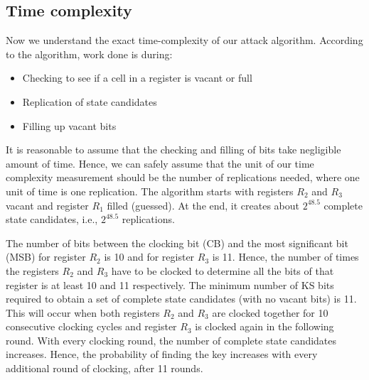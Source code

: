 \documentclass{llncs}
\begin{document}
\subsection{Time complexity} 
Now we understand the exact time-complexity of our attack algorithm. According to the algorithm, work done is during:
\begin{itemize}
\item {Checking to see if a cell in a register is vacant or full}
\item {Replication of state candidates}
\item{Filling up vacant bits}
\end{itemize}
It is reasonable to assume that the checking and filling of bits take negligible amount of time. Hence, we can safely assume that the unit of our time complexity measurement should be the number of replications needed, where one unit of time is one replication. The algorithm starts with registers $R_2$ and $R_3$ vacant and register $R_1$ filled (guessed). At the end, it creates about $2^{48.5}$ complete state candidates, i.e., $2^{48.5}$ replications. 

The number of bits between the clocking bit (CB) and the most significant bit (MSB) for register $R_{2}$ is 10 and for register $R_{3}$ is 11. Hence, the number of times the registers $R_{2}$ and $R_{3}$ have to be clocked to determine all the bits of that register is at least 10 and 11 respectively. The minimum number of KS bits required to obtain a set of complete state candidates (with no vacant bits) is 11. This will occur when both registers $R_{2}$ and $R_{3}$ are clocked together for 10 consecutive clocking cycles and register $R_{3}$ is clocked again in the following round. With every clocking round, the number of complete state candidates increases. Hence, the probability of finding the key increases with every additional round of clocking, after 11 rounds.
\end{document}
